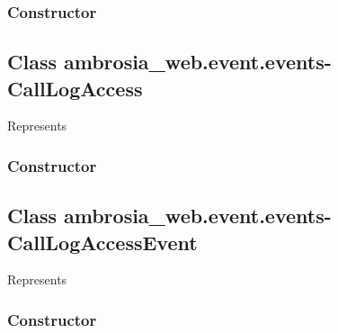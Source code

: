 \documentclass[letterpaper,10pt,english]{sphinxmanual}
\begin{document}
\subsubsection{Constructor}
\label{ambrosia_web.event.events-AnonymousFileEvent:constructor}

\begin{fulllineitems}
\label{ambrosia_web.event.events-AnonymousFileEvent:ambrosia_web.event.events-AnonymousFileEvent}
\end{fulllineitems}



\subsection{Class ambrosia\_web.event.events-CallLogAccess}
\label{ambrosia_web.event.events-CallLogAccess::doc}\label{ambrosia_web.event.events-CallLogAccess:class-ambrosia-web-event-events-calllogaccess}
Represents 


\subsubsection{Constructor}
\label{ambrosia_web.event.events-CallLogAccess:constructor}

\begin{fulllineitems}
\label{ambrosia_web.event.events-CallLogAccess:ambrosia_web.event.events-CallLogAccess}
\end{fulllineitems}



\subsection{Class ambrosia\_web.event.events-CallLogAccessEvent}
\label{ambrosia_web.event.events-CallLogAccessEvent:class-ambrosia-web-event-events-calllogaccessevent}\label{ambrosia_web.event.events-CallLogAccessEvent::doc}
Represents {\hyperref[ambrosia_plugins.apimonitor:ambrosia_plugins.apimonitor.CallLogAccessEvent]{}}


\subsubsection{Constructor}
\label{ambrosia_web.event.events-CallLogAccessEvent:constructor}
\end{document}
